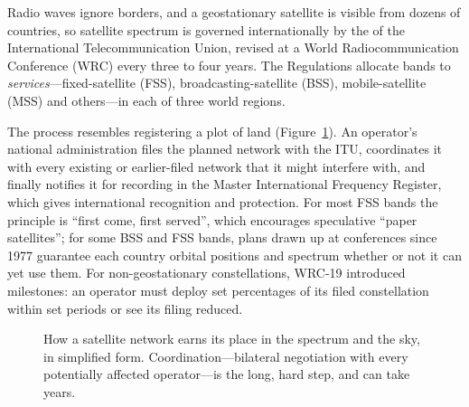 Radio waves ignore borders, and a geostationary satellite is visible from dozens of countries,
so satellite spectrum is governed internationally by the  of the
International Telecommunication Union, revised at a World Radiocommunication Conference (WRC)
every three to four years. The Regulations allocate bands to \emph{services}---fixed-satellite
(FSS), broadcasting-satellite (BSS), mobile-satellite (MSS) and others---in each of three
world regions.

The process resembles registering a plot of land (Figure~\ref{fig:ch23_itu_process}). An operator's
national administration files the planned network with the ITU, coordinates it with every existing or earlier-filed network that it
might interfere with, and finally notifies it for recording in the Master International Frequency
Register, which gives international recognition and protection. For most FSS bands the principle
is ``first come, first served'', which encourages speculative ``paper satellites''; for some BSS
and FSS bands, plans drawn up at conferences since 1977 guarantee each country orbital positions
and spectrum whether or not it can yet use them. For non-geostationary constellations, WRC-19
introduced milestones: an operator must deploy set percentages of its filed constellation within
set periods or see its filing reduced.

\begin{figure}[htbp]\centering
{}
\caption{How a satellite network earns its place in the spectrum and the sky, in simplified form.
Coordination---bilateral negotiation with every potentially affected operator---is the long, hard
step, and can take years.}
\label{fig:ch23_itu_process}
\end{figure}

